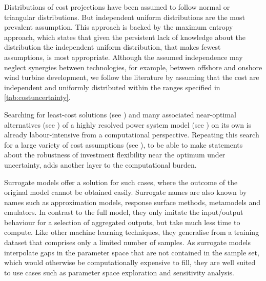 Distributions of cost projections have been assumed to follow
normal\cite{mavromatidis_uncertainty_2018} or triangular\cite{li_using_2020}
distributions. But independent uniform distributions are the most prevalent
assumption.\cite{moret_characterization_2017,moret_robust_2016,shirizadeh_how_2019,trondle_trade-offs_2020,pilpola_analyzing_2020,Li2017,Trutnevyte2013,lopion_cost_2019}
This approach is backed by the maximum entropy approach,
\cite{trondle_trade-offs_2020} which states that given the persistent lack of
knowledge about the distribution the independent uniform distribution, that
makes fewest assumptions, is most appropriate. Although the assumed independence
may neglect synergies between technologies, for example, between offshore and
onshore wind turbine development, we follow the literature by assuming that the
cost are independent and uniformly distributed within the ranges specified in
\cref{tab:costuncertainty}.



Searching for least-cost solutions (see ) and many
associated near-optimal alternatives (see ) of a highly
resolved power system model (see ) on its own is already
labour-intensive from a computational perspective. Repeating this search for a
large variety of cost assumptions (see ), to be able to
make statements about the robustness of investment flexibility near the optimum
under uncertainty, adds another layer to the computational burden.


Surrogate models offer a solution for such cases, where the outcome of the
original model cannot be obtained easily. Surrogate names are also known by
names such as approximation models, response surface methods, metamodels and
emulators. In contrast to the full model, they only imitate the input/output
behaviour for a selection of aggregated outputs, but take much less time to
compute.\cite{palar_multi-fidelity_2016} Like other machine learning techniques,
they generalise from a training dataset that comprises only a limited number of
samples. As surrogate models interpolate gaps in the parameter space that are
not contained in the sample set, which would otherwise be computationally
expensive to fill, they are well suited to use cases such as parameter space
exploration and sensitivity analysis.

